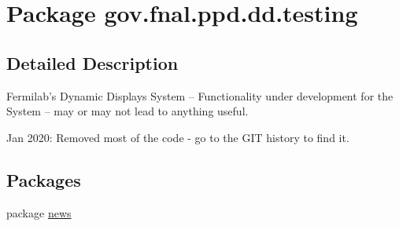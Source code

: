 \hypertarget{namespacegov_1_1fnal_1_1ppd_1_1dd_1_1testing}{\section{Package gov.\-fnal.\-ppd.\-dd.\-testing}
\label{namespacegov_1_1fnal_1_1ppd_1_1dd_1_1testing}
}


\subsection{Detailed Description}
Fermilab's Dynamic Displays System -- Functionality under development for the System -- may or may not lead to anything useful.

Jan 2020\-: Removed most of the code -\/ go to the G\-I\-T history to find it. \subsection*{Packages}
\begin{DoxyCompactItemize}
\item 
package \hyperlink{namespacegov_1_1fnal_1_1ppd_1_1dd_1_1testing_1_1news}{news}
\end{DoxyCompactItemize}
